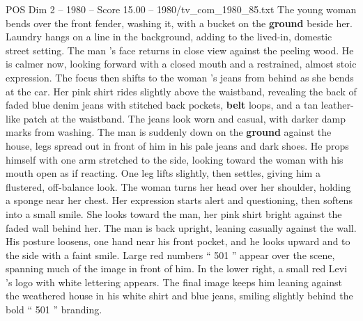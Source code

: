 \begin{textsample}{POS Dim 2 – 1980 – Score 15.00 – 1980/tv\_com\_1980\_85.txt}
The young woman bends over the front fender, washing it, with a bucket on the \textbf{ground} beside her.
Laundry hangs on a line in the background, adding to the lived-in, domestic street setting.
The man ’s face returns in close view against the peeling wood.
He is calmer now, looking forward with a closed mouth and a restrained, almost stoic expression.
The focus then shifts to the woman ’s jeans from behind as she bends at the car.
Her pink shirt rides slightly above the waistband, revealing the back of faded blue denim jeans with stitched back pockets, \textbf{belt} loops, and a tan leather-like patch at the waistband.
The jeans look worn and casual, with darker damp marks from washing.
The man is suddenly down on the \textbf{ground} against the house, legs spread out in front of him in his pale jeans and dark shoes.
He props himself with one arm stretched to the side, looking toward the woman with his mouth open as if reacting.
One leg lifts slightly, then settles, giving him a flustered, off-balance look.
The woman turns her head over her shoulder, holding a sponge near her chest.
Her expression starts alert and questioning, then softens into a small smile.
She looks toward the man, her pink shirt bright against the faded wall behind her.
The man is back upright, leaning casually against the wall.
His posture loosens, one hand near his front pocket, and he looks upward and to the side with a faint smile.
Large red numbers “ 501 ” appear over the scene, spanning much of the image in front of him.
In the lower right, a small red Levi ’s logo with white lettering appears.
The final image keeps him leaning against the weathered house in his white shirt and blue jeans, smiling slightly behind the bold “ 501 ” branding.

\end{textsample}
